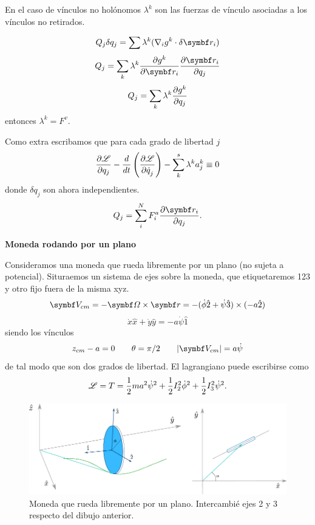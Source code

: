 \documentclass[10pt,oneside]{CBFT_book}
\begin{document}
En el caso de vínculos no holónomos $\lambda^k$ son las fuerzas de vínculo asociadas a los 
vínculos no retirados.

\[
	Q_j {\delta q_j} =  \sum \lambda^k (\nabla_i g^k\cdot\delta\vb{r}_i)
\]
\[
	Q_j =  \sum_k \lambda^k \dpar{g^k}{\vb{r}_i} \dpar{\vb{r}_i}{q_j}
\]
\[
	Q_j =  \sum_k \lambda^k \frac{\partial^{\hspace{-0.05em}} {g^k}}{\partial {q_j}^{\hspace{-0.05em}}}
\]
entonces $\lambda^k=F^v$.

Como extra escribamos que para cada grado de libertad $j$ 
\[
	\frac{\partial^{\hspace{-0.05em}} {\mathscr{L}}}{\partial {q_j}^{\hspace{-0.05em}}} - \frac{d}{dt}\left( \frac{\partial^{\hspace{-0.05em}} {\mathscr{L}}}{\partial {\dot{q}_j}^{\hspace{-0.05em}}} \right) - \sum_k^s \lambda^k a_j^k \equiv 0
\]
donde $\delta q_j$ son ahora independientes.
\[
	Q_j = \sum_i^N F_i^a \dpar{\vb{r}_i}{q_j}. 
\]

\begin{ejemplo}{\bf Moneda rodando por un plano}

Consideramos una moneda que rueda libremente por un plano (no sujeta a potencial).
Situraemos un sistema de ejes sobre la moneda, que etiquetaremos 123 y otro fijo fuera
de la misma xyz.
\[
	\vb{V}_{cm} = -\vb{\Omega} \times \vb{r} =
	-(\dot{\phi}\hat{2} + \dot{\psi}\hat{3}) \times (-a\hat{2})
\]
\[
	\dot{x}\hat{x} + \dot{y}\hat{y} = -a \dot{\psi}\hat{1}
\]
siendo los vínculos
\[
	z_{cm} - a = 0 \qquad \theta=\pi/2 \qquad |\vb{V}_{cm}| = a\dot{\psi}
\]
de tal modo que son dos grados de libertad. El lagrangiano puede escribirse como 
\[
	\mathscr{L} = T = \frac{1}{2}m a^2 \dot{\psi}^2  + \frac{1}{2} I_2^2 \dot{\phi}^2 + \frac{1}{2} I_3^2\dot{\psi}^2.
\]

\begin{figure}
	\begin{center}
	\includegraphics[width=1.0\textwidth]{images/fig_moneda.pdf}	 
	\end{center}
	\caption{Moneda que rueda libremente por un plano. Intercambié ejes 2 y 3 respecto del dibujo anterior.}
\end{figure} 


\end{ejemplo}
\end{document}
